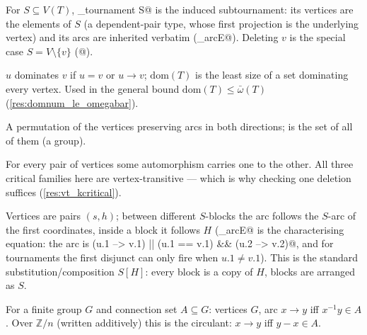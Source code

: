 


\noindent For $S \subseteq V(T)$, \rocqinline@sub_tournament S@ is the
induced subtournament: its vertices are the elements of $S$ (a
dependent-pair type, whose first projection \rocqinline@val@ is the
underlying vertex) and its arcs are inherited verbatim
(\rocqinline@sub_arcE@). Deleting $v$ is the special case
$S = V \setminus \{v\}$ (\rocqinline@[set~ v]@).




\noindent $u$ dominates $v$ if $u = v$ or $u \to v$;
$\mathrm{dom}(T)$ is the least size of a set dominating every vertex.
Used in the general bound $\mathrm{dom}(T) \le \bar\omega(T)$
(\cref{res:domnum_le_omegabar}).




\noindent A permutation of the vertices preserving arcs in both
directions; \rocqinline@dgaut@ is the set of all of them (a group).




\noindent For every pair of vertices some automorphism carries one to
the other. All three critical families here are vertex-transitive ---
which is why checking one deletion suffices
(\cref{res:vt_kcritical}).




\noindent Vertices are pairs $(s,h)$; between different $S$-blocks the
arc follows the $S$-arc of the first coordinates, inside a block it
follows $H$ (\rocqinline@lexprod_arcE@ is the characterising equation:
the arc is \rocqinline@(u.1 --> v.1) || (u.1 == v.1) && (u.2 --> v.2)@,
and for tournaments the first disjunct can only fire when
$u.1 \neq v.1$). This is the standard substitution/composition
$S[H]$: every block is a copy of $H$, blocks are arranged as $S$.




\noindent For a finite group $G$ and connection set $A \subseteq G$:
vertices $G$, arc $x \to y$ iff $x^{-1}y \in A$. Over
$\mathbb{Z}/n$ (written additively) this is the circulant: $x \to y$
iff $y - x \in A$.

